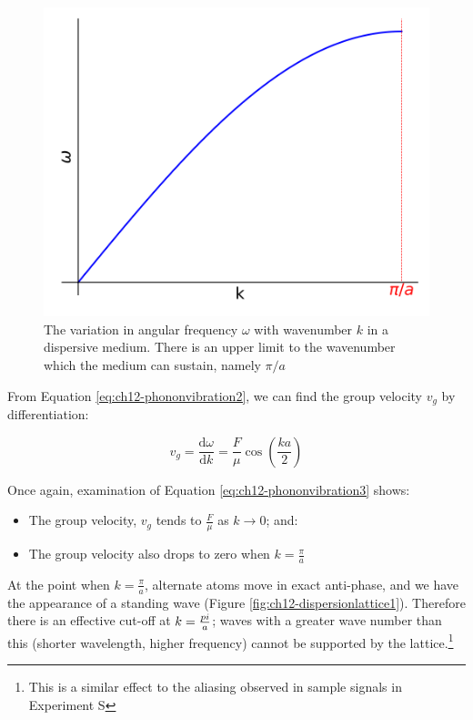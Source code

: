 \documentclass[
]{book}
\providecommand{\tightlist}{%
  \setlength{\itemsep}{0pt}\setlength{\parskip}{0pt}}
\begin{document}
\begin{figure}

{\centering \includegraphics[width=0.7\linewidth]{visualisations/ch12-dispersioncurve1} 

}

\caption{The variation in angular frequency $\omega$ with wavenumber $k$ in a dispersive medium. There is an upper limit to the wavenumber which the medium can sustain, namely $\pi / a$}\label{fig:ch12-dispersioncurve1}
\end{figure}

From Equation \eqref{eq:ch12-phononvibration2}, we can find the group velocity \(v_g\) by differentiation:

\begin{equation}
v_g = \frac{\mathrm{d}\omega}{\mathrm{d}k} = \frac{F}{\mu} \cos \left(\frac{ka}{2}\right)
\label{eq:ch12-phononvibration3}
\end{equation}

Once again, examination of Equation \eqref{eq:ch12-phononvibration3} shows:

\begin{itemize}
\tightlist
\item
  The group velocity, \(v_g\) tends to \(\frac{F}{\mu}\) as \(k \rightarrow 0\); and:
\item
  The group velocity also drops to zero when \(k = \frac{\pi}{a}\)
\end{itemize}

At the point when \(k = \frac{\pi}{a}\), alternate atoms move in exact anti-phase, and we have the appearance of a standing wave (Figure \ref{fig:ch12-dispersionlattice1}). Therefore there is an effective cut-off at \(k = \frac{\\pi}{a}\); waves with a greater wave number than this (shorter wavelength, higher frequency) cannot be supported by the lattice.\footnote{This is a similar effect to the aliasing observed in sample signals in Experiment S}
\end{document}
